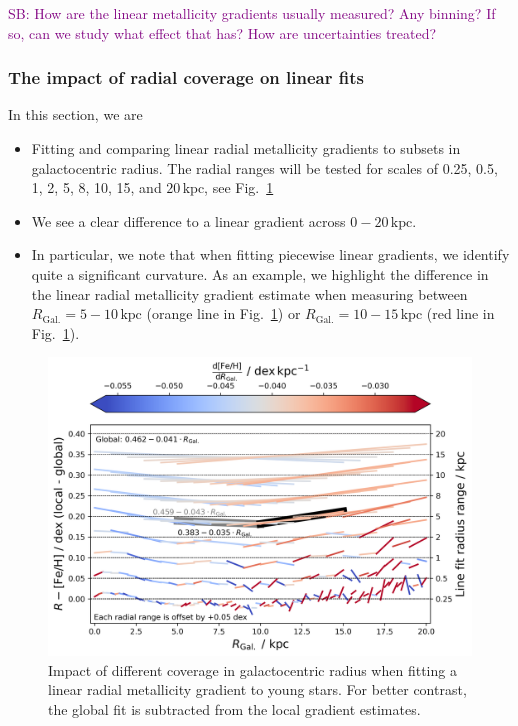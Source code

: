\documentclass[fleqn,usenatbib]{mnras}
\newcommand{\SB}[1]{{\textcolor{purple}{SB: #1}}}
\begin{document}



\SB{How are the linear metallicity gradients usually measured? Any binning? If so, can we study what effect that has? How are uncertainties treated?}

\subsubsection{The impact of radial coverage on linear fits}

In this section, we are
\begin{itemize}
    \item Fitting and comparing linear radial metallicity gradients to subsets in galactocentric radius. The radial ranges will be tested for scales of 0.25, 0.5, 1, 2, 5, 8, 10, 15, and $20\,\mathrm{kpc}$, see Fig.~\ref{fig:radial_range_impact}
    \item We see a clear difference to a linear gradient across $0-20\,\mathrm{kpc}$.
    \item In particular, we note that when fitting piecewise linear gradients, we identify quite a significant curvature. As an example, we highlight the difference in the linear radial metallicity gradient estimate when measuring between $R_\mathrm{Gal.} = 5-10\,\mathrm{kpc}$ (orange line in Fig.~\ref{fig:radial_range_impact}) or $R_\mathrm{Gal.} = 10-15\,\mathrm{kpc}$ (red line in Fig.~\ref{fig:radial_range_impact}).
\end{itemize}

\begin{figure}
    \centering
    \includegraphics[width=\columnwidth]{figures/radial_range_impact.png}
    \caption{Impact of different coverage in galactocentric radius when fitting a linear radial metallicity gradient to young stars. For better contrast, the global fit is subtracted from the local gradient estimates.}
    \label{fig:radial_range_impact}
\end{figure}
\end{document}
